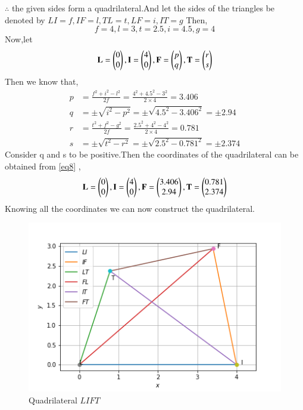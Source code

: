\documentclass[journal,12pt,twocolumn]{IEEEtran}
\begin{document}
$\therefore$ the given sides form a quadrilateral.And let the sides of the triangles be denoted by $LI=f,IF=l,TL=t,LF=i,IT=g$ 
Then,
\begin{equation}
   f=4,l=3,t=2.5,i=4.5,g=4 
\end{equation}
Now,let
\begin{equation}
\mathbf{L}=\begin{pmatrix}0\\0\end{pmatrix},\mathbf{I}=\begin{pmatrix}4\\0\end{pmatrix},\mathbf{F}=\begin{pmatrix}p\\q\end{pmatrix},\mathbf{T}=\begin{pmatrix}r\\s\end{pmatrix} \label{eq8}
\end{equation}
Then we know that,
\begin{align}
    p&=\frac{f^2+i^2-l^2}{2f}
    =\frac{4^2+4.5^2-3^2}{2\times 4}=3.406\\
   q&=\pm\sqrt{i^2-p^2}=\pm\sqrt{4.5^2-3.406^2}=\pm2.94\\
   r&=\frac{t^2+f^2-g^2}{2f}
    =\frac{2.5^2+4^2-4^2}{2\times 4}=0.781\\
   s&=\pm\sqrt{t^2-r^2}=\pm\sqrt{2.5^2-0.781^2}=\pm2.374
\end{align}
Consider q and s to be positive.Then the coordinates of the quadrilateral can be obtained from \ref{eq8} ,
\begin{equation}
\mathbf{L}=\begin{pmatrix}0\\0\end{pmatrix},\mathbf{I}=\begin{pmatrix}4\\0\end{pmatrix},\mathbf{F}=\begin{pmatrix}3.406\\2.94\end{pmatrix},\mathbf{T}=\begin{pmatrix}0.781\\2.374\end{pmatrix}
\end{equation}
Knowing all the coordinates we can now construct the quadrilateral.
\begin{figure}[ht]
    \includegraphics[width= \columnwidth]{quad1.png}
    \caption{Quadrilateral $LIFT$}
\end{figure}
\end{document}
